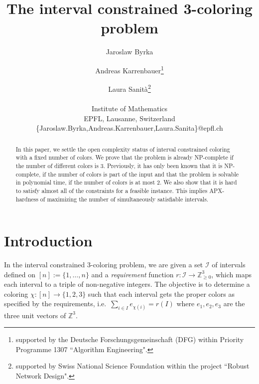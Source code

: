 \documentclass[a4paper,11pt]{article}
\author{Jaroslaw Byrka \and Andreas Karrenbauer\thanks{supported by the Deutsche Forschungsgemeinschaft (DFG)  within  Priority Programme 1307  ``Algorithm Engineering".}
 \and Laura Sanit\`a\thanks{supported by Swiss National Science Foundation within the project  ``Robust Network Design".} \\ \\
Institute of Mathematics \\ 
					EPFL, Lausanne, Switzerland \\
					{\{Jaroslaw.Byrka,Andreas.Karrenbauer,Laura.Sanita\}@epfl.ch}
}
\date{}
\title{The interval constrained 3-coloring problem}
\providecommand{\I}{\mathcal{I}}
\providecommand{\setZ}{\mathbb{Z}}
\theoremstyle{theorem}
\begin{document}
\maketitle

\begin{abstract}
In this paper, we settle the open complexity status of interval constrained coloring with a fixed number of colors. We prove that the problem is already NP-complete if the number of different colors is 3. Previously, it has only been known that it is NP-complete, if the number of colors is part of the input and that the problem is solvable in polynomial time, if the number of colors is at most 2. We also show that it is hard to satisfy almost all of the constraints for a feasible instance. This implies APX-hardness of maximizing the number of simultaneously satisfiable intervals.
\end{abstract}

\section{Introduction}

In the interval constrained 3-coloring problem, we are given a set $\I$ of intervals defined on $[n] := \{1,\ldots,n\}$ and a \emph{requirement} function $r : \I \to \setZ^3_{\ge 0}$, which maps each interval to a triple of non-negative integers. The objective is to determine a coloring $\chi : [n] \to \{1,2,3\}$ such that each interval gets the proper colors as specified by the requirements, i.e.~$\sum_{i \in I} e_{\chi(i)} = r(I)$ where $e_1,e_2,e_3$ are the three unit vectors of $\setZ^3$.
\end{document}
